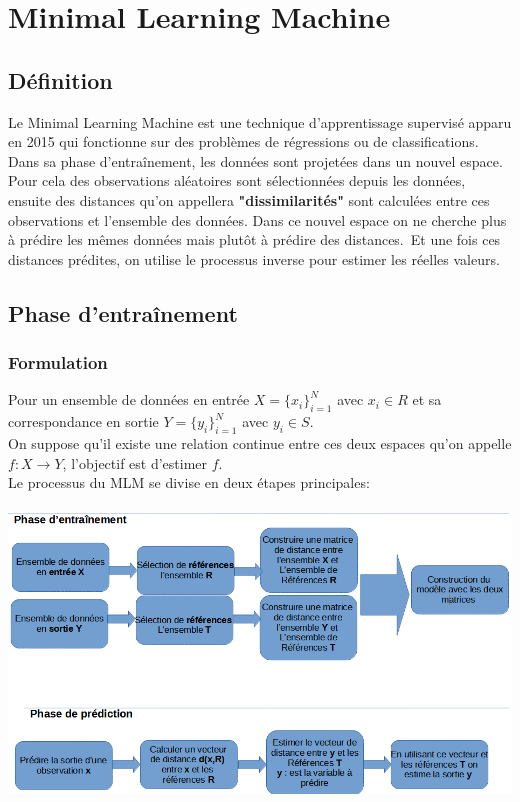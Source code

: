 \documentclass[12pt,a4paper]{report}
\begin{document}
{\color{MidnightBlue}\chapter{Minimal Learning Machine}}
{\color{MidnightBlue}\section{Définition}}
\par Le Minimal Learning Machine est une technique d'apprentissage supervisé apparu en 2015 qui fonctionne sur des problèmes de régressions ou de classifications. Dans sa phase d'entraînement, les données sont projetées dans un nouvel espace. Pour cela des observations aléatoires sont sélectionnées depuis les données, ensuite des distances qu'on appellera \textbf{"dissimilarités"} sont calculées entre ces observations et l'ensemble des données. Dans ce nouvel espace on ne cherche plus à prédire les mêmes données mais plutôt à prédire des distances.\ 
Et une fois ces distances prédites, on utilise le processus inverse pour estimer les réelles valeurs.\
{\color{MidnightBlue}\section{Phase d'entraînement}}
{\color{MidnightBlue}\subsection{Formulation}}
\par Pour un ensemble de données en entrée $X = \{x_i\}_{i=1}^{N}$ avec
$x_i \in R$ et sa correspondance en sortie $Y = \{y_i\}_{i=1}^{N}$ avec $y_i \in S$.\\
On suppose qu'il existe une relation continue entre ces deux espaces qu'on appelle $f: X \rightarrow Y$, l'objectif est d'estimer $f$.\\
Le processus du MLM se divise en deux étapes principales:\\\\
\includegraphics[scale=0.72]{schema.png}
\end{document}
